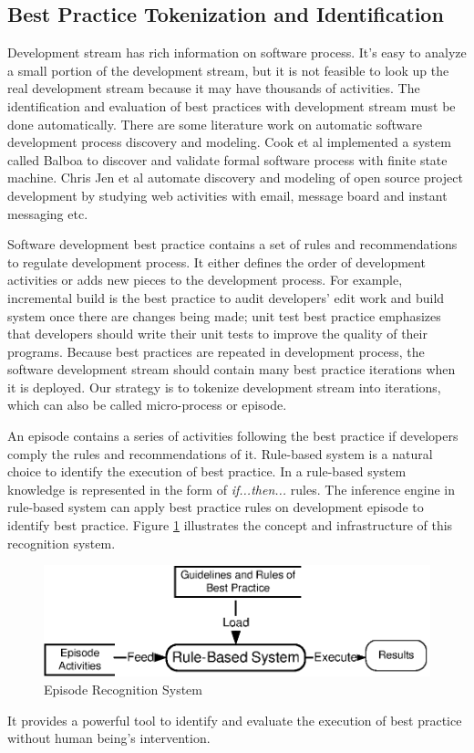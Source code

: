 \subsection{Best Practice Tokenization and Identification}
Development stream has rich information on software process. It's easy to
analyze a small portion of the development stream, but it is not feasible
to look up the real development stream because it may have thousands of
activities. The identification and evaluation of best practices with
development stream must be done automatically. There are some literature
work on automatic software development process discovery and modeling. Cook
et al \cite{Cook:95} implemented a system called Balboa to discover and
validate formal software process with finite state machine.  Chris Jen et
al automate discovery and modeling of open source project development by
studying web activities with email, message board and instant messaging
etc\cite{Jensen:04}.

Software development best practice contains a set of rules and
recommendations to regulate development process. It either defines the
order of development activities or adds new pieces to the development
process. For example, incremental build is the best practice to audit
developers' edit work and build system once there are changes being made;
unit test best practice emphasizes that developers should write their unit
tests to improve the quality of their programs. Because best practices are
repeated in development process, the software development stream should
contain many best practice iterations when it is deployed. Our strategy is
to tokenize development stream into iterations, which can also be called
micro-process or episode.

An episode contains a series of activities following the best practice if
developers comply the rules and recommendations of it. Rule-based system is a
natural choice to identify the execution of best practice. In a rule-based
system knowledge is represented in the form of \textit{if...then...}
rules\cite{Luger:02}. The inference engine in rule-based system can apply
best practice rules on development episode to identify best practice.
Figure \ref{fig:concept} illustrates the concept and infrastructure of this
recognition system.
\begin{figure}[h]
  \centering
  \includegraphics{figs/ConceptStructure.eps}
  \caption{Episode Recognition System}\label{fig:concept}
\end{figure} 
It provides a powerful tool to identify and evaluate the execution of best
practice without human being's intervention.


